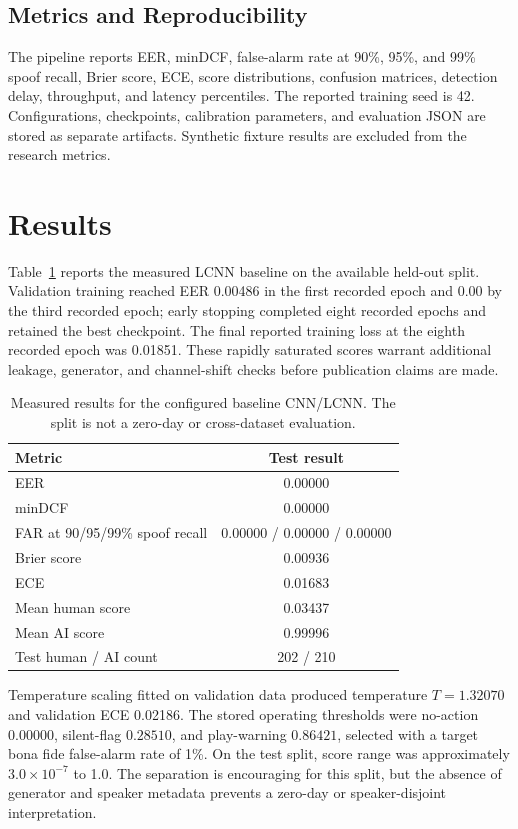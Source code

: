 \documentclass[journal]{IEEEtran}
\begin{document}
\subsection{Metrics and Reproducibility}
The pipeline reports EER, minDCF, false-alarm rate at 90\%, 95\%, and 99\% spoof recall, Brier score, ECE, score distributions, confusion matrices, detection delay, throughput, and latency percentiles. The reported training seed is 42. Configurations, checkpoints, calibration parameters, and evaluation JSON are stored as separate artifacts. Synthetic fixture results are excluded from the research metrics.

\section{Results}
Table~\ref{tab:results} reports the measured LCNN baseline on the available held-out split. Validation training reached EER 0.00486 in the first recorded epoch and 0.00 by the third recorded epoch; early stopping completed eight recorded epochs and retained the best checkpoint. The final reported training loss at the eighth recorded epoch was 0.01851. These rapidly saturated scores warrant additional leakage, generator, and channel-shift checks before publication claims are made.

\begin{table}[t]
\centering
\caption{Measured results for the configured baseline CNN/LCNN. The split is not a zero-day or cross-dataset evaluation.}
\label{tab:results}
\small
\begin{tabular}{lc}
\toprule
Metric & Test result\\
\midrule
EER & 0.00000\\
minDCF & 0.00000\\
FAR at 90/95/99\% spoof recall & 0.00000 / 0.00000 / 0.00000\\
Brier score & 0.00936\\
ECE & 0.01683\\
Mean human score & 0.03437\\
Mean AI score & 0.99996\\
Test human / AI count & 202 / 210\\
\bottomrule
\end{tabular}
\end{table}

Temperature scaling fitted on validation data produced temperature $T=1.32070$ and validation ECE 0.02186. The stored operating thresholds were no-action $0.00000$, silent-flag $0.28510$, and play-warning $0.86421$, selected with a target bona fide false-alarm rate of 1\%. On the test split, score range was approximately $3.0\times10^{-7}$ to 1.0. The separation is encouraging for this split, but the absence of generator and speaker metadata prevents a zero-day or speaker-disjoint interpretation.
\end{document}
